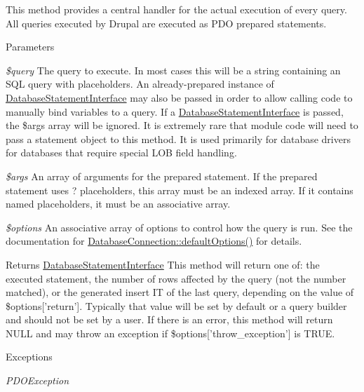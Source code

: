 This method provides a central handler for the actual execution of every query. All queries executed by Drupal are executed as PDO prepared statements.


\begin{DoxyParams}{Parameters}
\item[{\em \$query}]The query to execute. In most cases this will be a string containing an SQL query with placeholders. An already-\/prepared instance of \hyperlink{interfaceDatabaseStatementInterface}{DatabaseStatementInterface} may also be passed in order to allow calling code to manually bind variables to a query. If a \hyperlink{interfaceDatabaseStatementInterface}{DatabaseStatementInterface} is passed, the \$args array will be ignored. It is extremely rare that module code will need to pass a statement object to this method. It is used primarily for database drivers for databases that require special LOB field handling. \item[{\em \$args}]An array of arguments for the prepared statement. If the prepared statement uses ? placeholders, this array must be an indexed array. If it contains named placeholders, it must be an associative array. \item[{\em \$options}]An associative array of options to control how the query is run. See the documentation for \hyperlink{classDatabaseConnection_a190539d6c494ef2d7ac90d21226de5a5}{DatabaseConnection::defaultOptions()} for details.\end{DoxyParams}
\begin{DoxyReturn}{Returns}
\hyperlink{interfaceDatabaseStatementInterface}{DatabaseStatementInterface} This method will return one of: the executed statement, the number of rows affected by the query (not the number matched), or the generated insert IT of the last query, depending on the value of \$options\mbox{[}'return'\mbox{]}. Typically that value will be set by default or a query builder and should not be set by a user. If there is an error, this method will return NULL and may throw an exception if \$options\mbox{[}'throw\_\-exception'\mbox{]} is TRUE.
\end{DoxyReturn}

\begin{DoxyExceptions}{Exceptions}
\item[{\em PDOException}]\end{DoxyExceptions}


